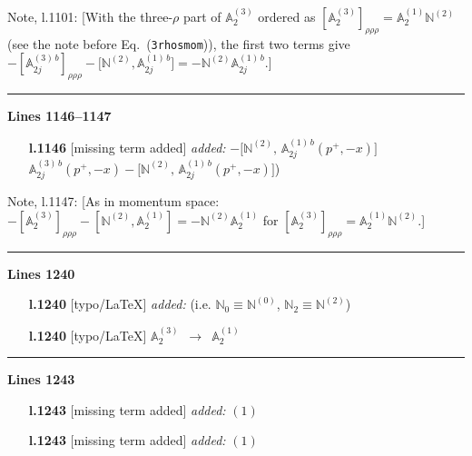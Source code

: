 \documentclass[10pt]{article}
\newenvironment{notebox}{\def\FrameCommand{{\color{notebar}\vrule width 1.5pt}\hspace{6pt}}\MakeFramed{\advance\hsize-\width\FrameRestore}\small}{\endMakeFramed}
\def\mf#1{\mathbb{#1}}
\begin{document}
\begin{notebox}\textsf{\small Note, l.1101:} [With the three-$\rho$ part of $\mf{A}^{(3)}_2$ ordered as $[\mf{A}^{(3)}_2]_{\rho\rho\rho}=\mf{A}^{(1)}_2\mf{N}^{(2)}$ (see the note before Eq.~(\texttt{3rhosmom})), the first two terms give $-[\mf{A}^{(3)\,b}_{2j}]_{\rho\rho\rho}-\big[\mf{N}^{(2)},\mf{A}^{(1)\,b}_{2j}\big]=-\mf{N}^{(2)}\mf{A}^{(1)\,b}_{2j}$.]\end{notebox}
\noindent\rule{\linewidth}{0.3pt}\par\noindent\textbf{Lines 1146--1147} \par
\begin{itemize}[leftmargin=2.2em,itemsep=1pt,topsep=2pt]
\item[\textbf{l.1146}] \textsf{\small [missing term added]} \emph{added:} $\displaystyle -\big[\mf{N}^{(2)},\,\mf{A}^{(1)\, b}_{2j}(p^{+},-x)\big]$$\displaystyle \mf{A}^{(3)\, b}_{2j}(p^{+}, -x) -\big[\mf{N}^{(2)},\,\mf{A}^{(1)\, b}_{2j}(p^{+},-x)\big]${\color{gray}\small)}
\end{itemize}
\begin{notebox}\textsf{\small Note, l.1147:} [As in momentum space: $-[\mf{A}^{(3)}_2]_{\rho\rho\rho}-[\mf{N}^{(2)},\mf{A}^{(1)}_2]=-\mf{N}^{(2)}\mf{A}^{(1)}_2$ for $[\mf{A}^{(3)}_2]_{\rho\rho\rho}=\mf{A}^{(1)}_2\mf{N}^{(2)}$.]\end{notebox}
\noindent\rule{\linewidth}{0.3pt}\par\noindent\textbf{Lines 1240}\par
\begin{itemize}[leftmargin=2.2em,itemsep=1pt,topsep=2pt]
\item[\textbf{l.1240}] \textsf{\small [typo/LaTeX]} \emph{added:} (i.e. $\mf{N}_0\equiv\mf{N}^{(0)}$, $\mf{N}_2\equiv\mf{N}^{(2)}$)
\item[\textbf{l.1240}] \textsf{\small [typo/LaTeX]} $\mf{A}^{(3)}_{2}$\ $\longrightarrow$\ $\mf{A}^{(1)}_{2}$
\end{itemize}
\noindent\rule{\linewidth}{0.3pt}\par\noindent\textbf{Lines 1243} \par
\begin{itemize}[leftmargin=2.2em,itemsep=1pt,topsep=2pt]
\item[\textbf{l.1243}] \textsf{\small [missing term added]} \emph{added:} $\displaystyle (1)$
\item[\textbf{l.1243}] \textsf{\small [missing term added]} \emph{added:} $\displaystyle (1)$
\end{itemize}
\end{document}
